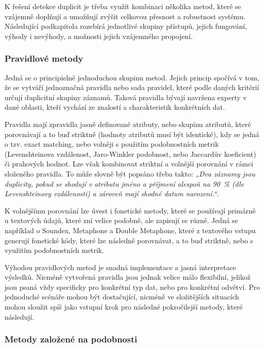 K řešení detekce duplicit je třeba využít kombinaci několika metod, které se vzájemně doplňují a umožňují zvýšit celkovou přesnost a robustnost systému. Následující podkapitola rozebírá jednotlivé skupiny přístupů, jejich fungování, výhody i nevýhody, a možnosti jejich vzájemného propojení.


\subsubsection {Pravidlové metody}
Jedná se o principielně jednoduchou skupinu metod. Jejich princip spočívá v tom, že se vytváří jednoznačná pravidla nebo sada pravidel, které podle daných kritérií určují duplicitní skupiny záznamů. Taková pravidla bývají navržena experty v dané oblasti, kteří vychází ze znalostí a charakteristik konkrétních dat.

Pravidla mají zpravidla jasně definované atributy, nebo skupinu atributů, které porovnávají a to buď striktně (hodnoty atributů musí být identické), kdy se jedná o tzv. exact matching, nebo volněji s použitím podobnostních metrik (Levenshteinova vzdálenost, Jaro-Winkler podobnost, nebo Jaccardův koeficient) či prahových hodnot. Lze však kombinovat striktní a volnější porovnání v rámci složeného pravidla. To může slovně být popsáno třeba takto: \textit{„Dva záznamy jsou duplicity, pokud se shodují v atributu jméno a příjmení alespoň na 90~\% (dle Levenshteinovy vzdálenosti) a zároveň mají shodné datum narození.“}.

K volnějšímu porovnání lze úvest i fonetické metody, které se používají primárně u textových údajů, které zní velice podobně, ale zapisují se různě. Jedná se například o Soundex, Metaphone a Double Metaphone, které z textového vstupu generují fonetické kódy, které lze následně porovnávat, a to buď striktně, nebo s využitím podobnostních metrik.

Výhodou pravidlových metod je snadná implementace a jasná interpretace výsledků. Nicméně vytvořená pravidla jsou jednak velice málo flexibilní, jelikož jsou psaná vždy specificky pro konkrétní typ dat, nebo pro konkrétní odvětví. Pro jednoduché scénáře mohou být dostačující, nicméně ve složitějších situacích mohou sloužit spíš jako vstupní krok pro následné pokročilejší metody, které následují.

\subsubsection {Metody založené na podobnosti}

